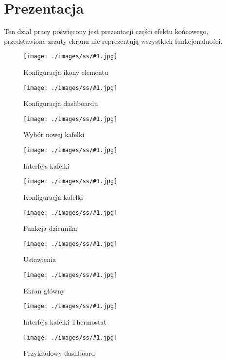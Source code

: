 \newcommand{\screenShot}[2]{
    \begin{minipage}{0.48\textwidth}
        \begin{figure}[H]
            \centering
            \texttt{[image: ./images/ss/\#1.jpg]}
            \caption{#2}
        \end{figure}
    \end{minipage}
}

\section{Prezentacja}
Ten dział pracy poświęcony jest prezentacji części efektu końcowego, przedstawione zrzuty ekranu nie reprezentują wszystkich funkcjonalności.\\

\screenShot{1}{Konfiguracja ikony elementu}
\screenShot{2}{Konfiguracja dashboardu}

\newpage

\screenShot{3}{Wybór nowej kafelki}
\screenShot{4}{Interfejs kafelki }

\newpage

\screenShot{5}{Konfiguracja kafelki}
\screenShot{6}{Funkcja dziennika}

\newpage

\screenShot{7}{Ustawienia}
\screenShot{8}{Ekran główny}

\newpage

\screenShot{9}{Interfejs kafelki Thermostat}
\screenShot{10}{Przykładowy dashboard}